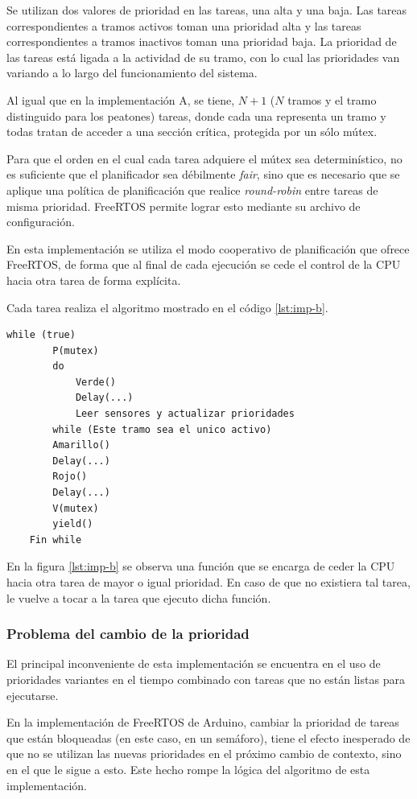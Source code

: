 Se utilizan dos valores de prioridad en las tareas, una alta y una baja.
Las tareas correspondientes a tramos activos toman una prioridad alta y las tareas correspondientes a tramos inactivos toman una prioridad baja. 
La prioridad de las tareas está ligada a la actividad de su tramo, con lo cual las prioridades van variando a lo largo del funcionamiento del sistema.

Al igual que en la implementación A, se tiene, $N + 1$ ($N$ tramos y el tramo distinguido para los peatones) tareas, donde cada una representa un tramo y todas tratan de acceder a una sección crítica, protegida por un sólo mútex.

Para que el orden en el cual cada tarea adquiere el mútex sea determinístico, no es suficiente que el planificador sea débilmente \emph{fair}, sino que es necesario que se aplique una política de planificación que realice \emph{round-robin} entre tareas de misma prioridad.
FreeRTOS permite lograr esto mediante su archivo de configuración.

En esta implementación se utiliza el modo cooperativo de planificación que ofrece FreeRTOS, de forma que al final de cada ejecución se cede el control de la CPU hacia otra tarea de forma explícita.

Cada tarea realiza el algoritmo mostrado en el código \ref{lst:imp-b}.

\begin{lstlisting}[float, label=lst:imp-b, caption=Pseudocódigo del programa que corre cada tarea en la implementación B.]
	while (true)
		P(mutex)
		do
			Verde()
			Delay(...)
			Leer sensores y actualizar prioridades
		while (Este tramo sea el unico activo)
		Amarillo()
		Delay(...)
		Rojo()
		Delay(...)
		V(mutex)
		yield()
	Fin while
\end{lstlisting}

En la figura \ref{lst:imp-b} se observa una función  que se encarga de ceder la CPU hacia otra tarea de mayor o igual prioridad.
En caso de que no existiera tal tarea, le vuelve a tocar a la tarea que ejecuto dicha función.

\subsubsection{Problema del cambio de la prioridad}
El principal inconveniente de esta implementación se encuentra en el uso de prioridades variantes en el tiempo combinado con tareas que no están listas para ejecutarse.

En la implementación de FreeRTOS de Arduino, cambiar la prioridad de tareas que están bloqueadas (en este caso, en un semáforo), tiene el efecto inesperado de que no se utilizan las nuevas prioridades en el próximo cambio de contexto, sino en el que le sigue a esto. Este hecho rompe la lógica del algoritmo de esta implementación.

